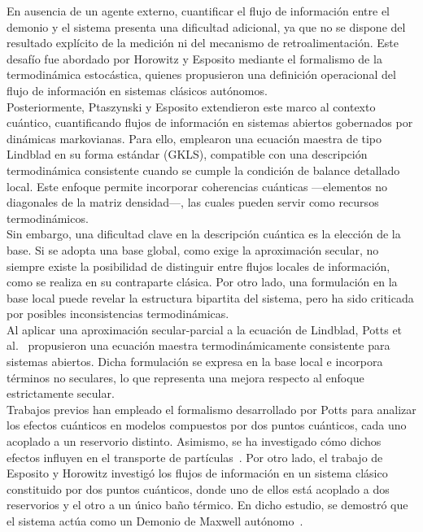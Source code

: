 En ausencia de un agente externo, cuantificar el flujo de información entre el demonio y el sistema presenta una dificultad adicional, ya que no se dispone del resultado explícito de la medición ni del mecanismo de retroalimentación. Este desafío fue abordado por Horowitz y Esposito mediante el formalismo de la termodinámica estocástica\cite{horowitz2014thermodynamics}, quienes propusieron una definición operacional del flujo de información en sistemas clásicos autónomos.\\

Posteriormente, Ptaszynski y Esposito extendieron este marco al contexto cuántico, cuantificando flujos de información en sistemas abiertos gobernados por dinámicas markovianas\cite{ptaszynski2019thermodynamics}. Para ello, emplearon una ecuación maestra de tipo Lindblad en su forma estándar (GKLS)\cite{gorini1976completely,lindblad1976generators,breuer2002theory}, compatible con una descripción termodinámica consistente cuando se cumple la condición de balance detallado local. Este enfoque permite incorporar coherencias cuánticas —elementos no diagonales de la matriz densidad—, las cuales pueden servir como recursos termodinámicos\cite{ptaszynski2023fermionic,streltsov2017colloquium}.\\

Sin embargo, una dificultad clave en la descripción cuántica es la elección de la base. Si se adopta una base global, como exige la aproximación secular, no siempre existe la posibilidad de distinguir entre flujos locales de información, como se realiza en su contraparte clásica\cite{horowitz2014thermodynamics}. Por otro lado, una formulación en la base local puede revelar la estructura bipartita del sistema, pero ha sido criticada por posibles inconsistencias termodinámicas\cite{levy2014local,novotny2002investigation}.\\

Al aplicar una aproximación secular-parcial a la ecuación de Lindblad, Potts et al.\ \cite{potts2021thermodynamically} propusieron una ecuación maestra termodinámicamente consistente para sistemas abiertos. 
Dicha formulación se expresa en la base local e incorpora términos no seculares, lo que representa una mejora respecto al enfoque estrictamente secular. \\

Trabajos previos han empleado el formalismo desarrollado por Potts para analizar los efectos cuánticos en modelos compuestos por dos puntos cuánticos, cada uno acoplado a un reservorio distinto. Asimismo, se ha investigado cómo dichos efectos influyen en el transporte de partículas~\cite{prech2023entanglement}. Por otro lado, el trabajo de Esposito y Horowitz investigó los flujos de información en un sistema clásico constituido por dos puntos cuánticos, donde uno de ellos está acoplado a dos reservorios y el otro a un único baño térmico. En dicho estudio, se demostró que el sistema actúa como un Demonio de Maxwell autónomo~\cite{horowitz2014thermodynamics}.\\

